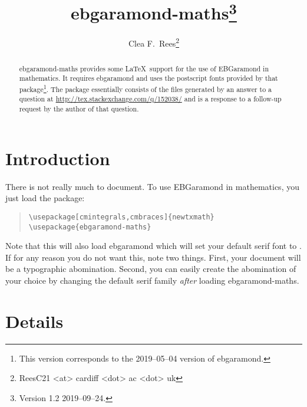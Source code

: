 \documentclass[12pt,british,a4paper]{article}
\title{ebgaramond-maths\thanks{Version 1.2 2019--09--24.}}
\author{Clea F.\ Rees\footnote{\liningfam ReesC21 <at> cardiff <dot> ac <dot> uk}}
\date{\dyddiad}
\makeatletter
\DeclareRobustCommand{\liningfam}{\fontfamily{EBGaramond-\ebgaramond@figurealign LF}\selectfont}
\makeatother
\begin{document}
\maketitle\thispagestyle{empty}

\newcommand*{\lpack}[1]{\textsf{#1}}

\begin{abstract}
  \liningfam
  \noindent\lpack{ebgaramond-maths} provides some \LaTeX\ support for the use of EBGaramond in mathematics.
  It requires \lpack{ebgaramond} and uses the postscript fonts provided by that package\footnote{This version corresponds to the 2019--05--04 version of \lpack{ebgaramond}.}.
  The package essentially consists of the files generated by an answer to a question at \url{http://tex.stackexchange.com/q/152038/} and is a response to a follow-up request by the author of that question.
\end{abstract}

\section{Introduction}\label{sec:intro}
There is not really much to document.
To use EBGaramond in mathematics, you just load the package:
\begin{quote}
\begin{verbatim}
\usepackage[cmintegrals,cmbraces]{newtxmath}
\usepackage{ebgaramond-maths}
\end{verbatim}
\end{quote}
Note that this will also load \lpack{ebgaramond} which will set your default serif font to .
If for any reason you do not want this, note two things.
First, your document will be a typographic abomination.
Second, you can easily create the abomination of your choice by changing the default serif family \emph{after} loading \lpack{ebgaramond-maths}.

\section{Details}\label{sec:manylion}
\end{document}
